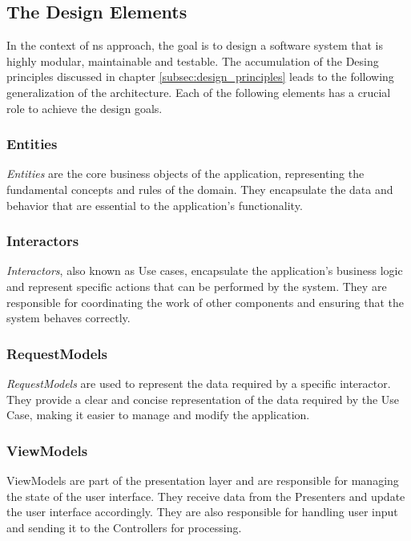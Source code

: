 \subsection{The Design Elements} \label{subsec:design_elements}

In the context of \gls{ns} approach, the goal is to design a software system that is highly
modular, maintainable and testable. The accumulation of the Desing principles discussed
in chapter \ref{subsec:design_principles} leads to the following generalization of the
architecture. Each of the following elements has a crucial role to achieve the
design goals.

\subsubsection{Entities}
\textit{Entities} are the core business objects of the application, representing the fundamental
concepts and rules of the domain. They encapsulate the data and behavior that are
essential to the application's functionality.

\subsubsection{Interactors}
\textit{Interactors}, also known as Use cases, encapsulate the application's business
logic and represent specific actions that can be performed by the system. They are
responsible for coordinating the work of other components and ensuring that the system
behaves correctly.

\subsubsection{RequestModels}
\textit{RequestModels} are used to represent the data required by a specific interactor. They
provide a clear and concise representation of the data required by the Use Case, making it
easier to manage and modify the application.

\subsubsection{ViewModels}
ViewModels are part of the presentation layer and are responsible for managing the state
of the user interface. They receive data from the Presenters and update the user interface
accordingly. They are also responsible for handling user input and sending it to the
Controllers for processing.

